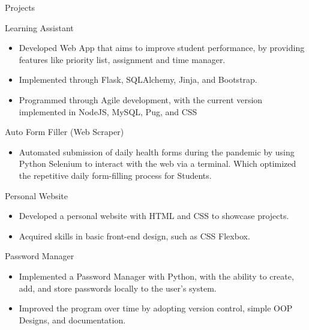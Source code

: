 \documentclass{article}
\newlength{\tabin}
\newlength{\secsep}
\newcommand{\lineunder}{\vspace*{-8pt} \\ \hspace*{-6pt} \hrulefill \\ \vspace*{-15pt}}
\newenvironment{tabbedsection}[1]{
  \begin{list}{}{
      \setlength{\itemsep}{0pt}
      \setlength{\labelsep}{0pt}
      \setlength{\labelwidth}{0pt}
      \setlength{\leftmargin}{\tabin}
      \setlength{\rightmargin}{\tabin}
      \setlength{\listparindent}{0pt}
      \setlength{\parsep}{0pt}
      \setlength{\parskip}{0pt}
      \setlength{\partopsep}{0pt}
      \setlength{\topsep}{#1}
    }
  \item[]
}{\end{list}}
\newenvironment{resume_section}[1]{
  \filbreak
  \vspace{2\secsep}
  \textsc{\large#1}
  \lineunder
  \begin{tabbedsection}{\secsep}
}{\end{tabbedsection}}
\newenvironment{resume_subsection}[2][]{
  \textbf{#2} \hfill {\footnotesize #1} \hspace{-5.1em}
  \begin{tabbedsection}{0.5\secsep}
}{\end{tabbedsection}}
\newenvironment{subitems}{
  \renewcommand{\labelitemi}{-}
  \begin{itemize}
      \setlength{\labelsep}{1em}
}{\end{itemize}}
\begin{document}
\begin{resume_section}{Projects}
  \begin{resume_subsection}[]{Learning Assistant}
   \begin{subitems}
      \item Developed Web App that aims to improve student performance, by providing features like priority list, assignment and time manager.
      \item Implemented through Flask, SQLAlchemy, Jinja, and Bootstrap.
      \item Programmed through Agile development, with the current version implemented in NodeJS, MySQL, Pug, and CSS
    \end{subitems}
  \end{resume_subsection}

  \begin{resume_subsection}[]{Auto Form Filler (Web Scraper)}
    \begin{subitems}
      \item Automated submission of daily health forms during the pandemic by using Python Selenium to interact with the web via a terminal. Which optimized the repetitive daily form-filling process for Students.
    \end{subitems}
  \end{resume_subsection}

  \begin{resume_subsection}[]{Personal Website}
    \begin{subitems}
      \item Developed a personal website with HTML and CSS to showcase projects.
      \item Acquired skills in basic front-end design, such as CSS Flexbox.
    \end{subitems}
  \end{resume_subsection}

  \begin{resume_subsection}[]{Password Manager}
    \begin{subitems}
      \item Implemented a Password Manager with Python, with the ability to create, add, and store passwords locally to the user's system.
      \item Improved the program over time by adopting version control, simple OOP Designs, and documentation.
    \end{subitems}
  \end{resume_subsection}

\end{resume_section}
\end{document}

